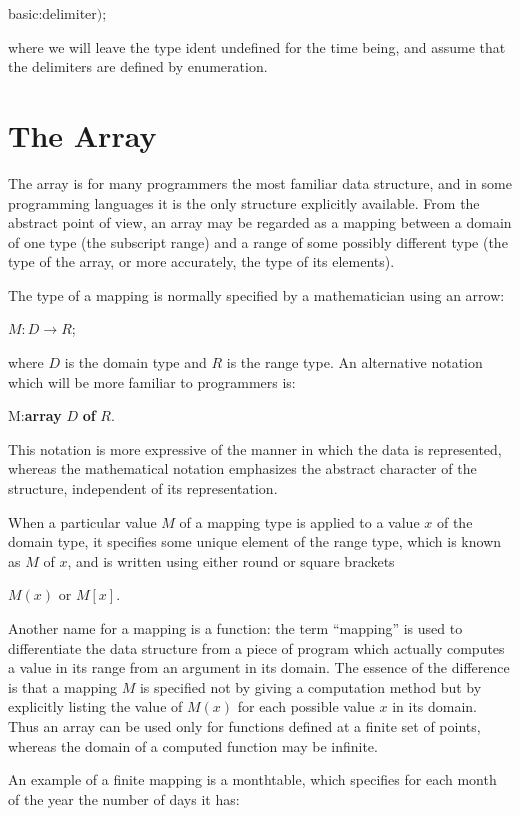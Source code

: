 \tabto*{6em}basic:delimiter$)$;

\noindent
where we will leave the type ident undefined for the time being, and assume that the delimiters are defined by enumeration.

\section[The array]{The Array}
\label{sec:array}

The array is for many programmers the most familiar data structure, and in some programming languages it is the only structure explicitly available. From the abstract point of view, an array may be regarded as a mapping between a domain of one type (the subscript range) and a range of some possibly different type (the type of the array, or more accurately, the type of its elements).

The type of a mapping is normally specified by a mathematician using an arrow:

\quad $M:D\rightarrow R$;

\noindent
where $D$ is the domain type and $R$ is the range type. An alternative notation which will be more familiar to programmers is:

\quad M:\textbf{array} $D$ \textbf{of} $R$.

\noindent
This notation is more expressive of the manner in which the data is represented, whereas the mathematical notation emphasizes the abstract character of the structure, independent of its representation.

When a particular value $M$ of a mapping type is applied to a value $x$ of the domain type, it specifies some unique element of the range type, which is known as $M$ of $x$, and is written using either round or square brackets

\quad $M(x)$ or $M[x]$.

\noindent
Another name for a mapping is a function: the term ``mapping'' is used to differentiate the data structure from a piece of program which actually computes a value in its range from an argument in its domain. The essence of the difference is that a mapping $M$ is specified not by giving a computation method but by explicitly listing the value of $M(x)$ for each possible value $x$ in its domain. Thus an array can be used only for functions defined at a finite set of points, whereas the domain of a computed function may be infinite.

An example of a finite mapping is a monthtable, which specifies for each month of the year the number of days it has:

